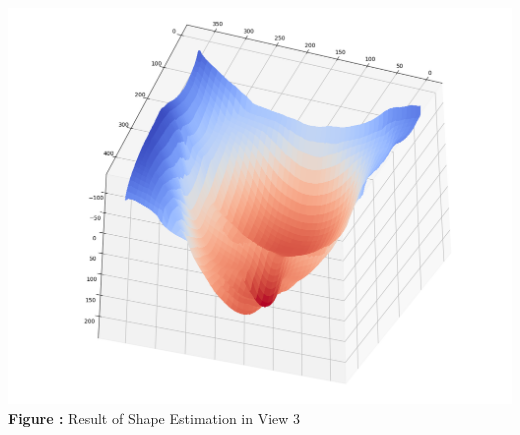 \documentclass{article}
\begin{document}
	\begin{minipage}{1\linewidth}
	\centering
	\includegraphics[width=0.8\columnwidth, height=0.6\linewidth]{./Q1_i_res3.png}
	  \\%
	\textbf{Figure \thefigure:} Result of Shape Estimation in View 3  %
	\label{fig:Q1_i_res3}         %
	\end{minipage}

	\newpage
\end{document}
